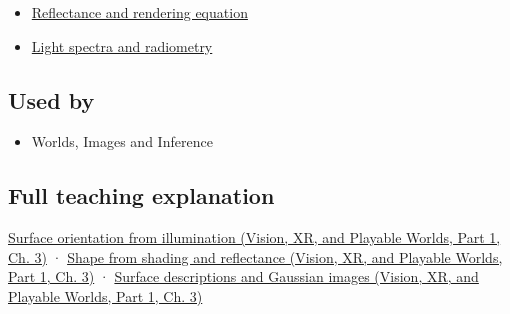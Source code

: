 \begin{itemize}
\tightlist
\item
  \hyperref[appendix-96da0b153b77]{Reflectance and rendering equation}
\item
  \hyperref[appendix-215c2570199b]{Light spectra and radiometry}
\end{itemize}

\subsection{Used by}\label{appendix-89b2d5b7c9e1-used-by}

\hypertarget{appendix-89b2d5b7c9e1-used-by}{}

\begin{itemize}
\tightlist
\item
  {Worlds, Images and Inference}
\end{itemize}

\subsection{Full teaching explanation}\label{appendix-89b2d5b7c9e1-full-teaching-explanation}

\hypertarget{appendix-89b2d5b7c9e1-full-teaching-explanation}{}

\href{../07-Vision-XR-and-Playable-Worlds-P01/main.pdf\#nameddest=04-visual-computing-ii-ch032-surface-orientation-from-illumination}{Surface orientation from illumination (Vision, XR, and Playable Worlds, Part 1, Ch. 3)} · \href{../07-Vision-XR-and-Playable-Worlds-P01/main.pdf\#nameddest=04-visual-computing-ii-ch032-shape-from-shading-and-reflectance}{Shape from shading and reflectance (Vision, XR, and Playable Worlds, Part 1, Ch. 3)} · \href{../07-Vision-XR-and-Playable-Worlds-P01/main.pdf\#nameddest=04-visual-computing-ii-ch032-surface-descriptions-and-gaussian-images}{Surface descriptions and Gaussian images (Vision, XR, and Playable Worlds, Part 1, Ch. 3)}
